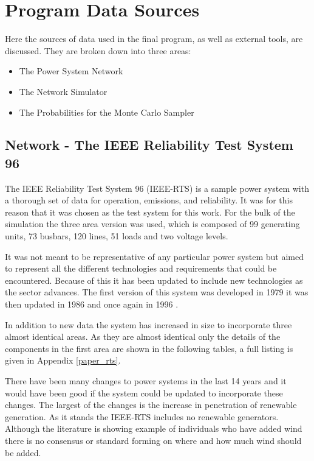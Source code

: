 \documentclass[a4paper,oneside,12pt]{report}
\begin{document}
\section{Program Data Sources}

Here the sources of data used in the final program, as well as external tools, are discussed. They are broken down into three areas:

\begin{itemize}
\item The Power System Network
\item The Network Simulator
\item The Probabilities for the Monte Carlo Sampler
\end{itemize}

\subsection{Network - The IEEE Reliability Test System 96\label{lbl_RTS}}

The IEEE Reliability Test System 96 (IEEE-RTS) \cite{Grigg1999} is a sample power system with a thorough set of data for operation, emissions, and reliability. It was for this reason that it was chosen as the test system for this work. For the bulk of the simulation the three area version was used, which is composed of 99 generating units, 73 busbars, 120 lines, 51 loads and two voltage levels.

It was not meant to be representative of any particular power system but aimed to represent all the different technologies and requirements that could be encountered. Because of this it has been updated to include new technologies as the sector advances. The first version of this system was developed in 1979 \cite{IEEERTSTaskForceofAPMSubcommittee1979} it was then updated in 1986 \cite{Allan1986} and once again in 1996 \cite{Grigg1999}.

In addition to new data the system has increased in size to incorporate three almost identical areas. As they are almost identical only the details of the components in the first area are shown in the following tables, a full listing is given in Appendix \ref{paper_rts}.

There have been many changes to power systems in the last 14 years and it would have been good if the system could be updated to incorporate these changes. The largest of the changes is the increase in penetration of renewable generation. As it stands the IEEE-RTS includes no renewable generators. Although the literature is showing example of individuals who have added wind there is no consensus or standard forming on where and how much wind should be added.
\end{document}
